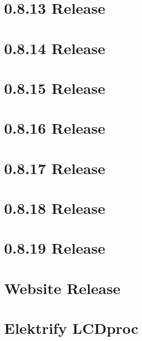 \documentclass[twoside]{book}
\newcommand{\+}{\discretionary{\mbox{\scriptsize$\hookleftarrow$}}{}{}}
\begin{document}
\chapter{0.8.13 Release}
\label{doc_news_2015-09-17_0_8_13_md}

\chapter{0.8.14 Release}
\label{doc_news_2015-11-19_0_8_14_md}

\chapter{0.8.15 Release}
\label{doc_news_2016-02-16_0_8_15_md}

\chapter{0.8.16 Release}
\label{doc_news_2016-04-29_0_8_16_md}

\chapter{0.8.17 Release}
\label{doc_news_2016-06-14_0_8_17_md}

\chapter{0.8.18 Release}
\label{doc_news_2016-09-17_0_8_18_md}

\chapter{0.8.19 Release}
\label{doc_news_2016-11-22_0_8_19_md}

\chapter{Website Release}
\label{doc_news_2016-12-17_website_release_md}

\chapter{Elektrify L\+C\+Dproc}
\label{doc_news_2017-03-18_lcdproc_md}

\end{document}
